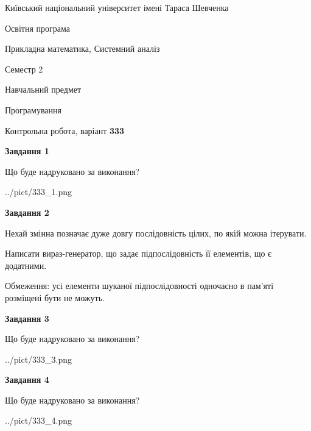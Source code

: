 \documentclass[12pt, ukrainian]{article}
\begin{document}
{{\begin {small}\par
{ \center  Київський національний університет імені Тараса Шевченка \par}
{\parbox {5 cm}{Освітня програма \hfill}{\parbox {8 cm}{Прикладна математика, Системний аналіз \hfill}}\parbox {5 cm}{\hfill Семестр 2}}\par
{\parbox {5 cm} {Навчальний предмет \hfill}\parbox {7 cm}{Програмування \hfill}\parbox {6cm}{\hfill}\par}\vspace{-7pt} \end{small}}{\center Контрольна робота, варіант  \No \textbf
{ 333 }\par}}
{
\begin {large}
{\begin {center}\textbf{Завдання 1}\end {center}}\par
Що буде надруковано за виконання?\par\par
\begin{center}
	{../pict/333_1.png}
\end{center}
\newpage

{\begin {center}\textbf{Завдання 2}\end {center}}\par
Нехай змінна  позначає дуже довгу послідовність цілих, по якій можна ітерувати.

Написати вираз-генератор, що задає підпослідовність її елементів, що є додатни\-ми.

Обмеження: усі елементи шуканої підпослідовності одночасно в пам'яті розміщені бути не можуть.\par
\newpage

{\begin {center}\textbf{Завдання 3}\end {center}}\par
Що буде надруковано за виконання?\par
\begin{center}
	{../pict/333_3.png}
\end{center}
\newpage

{\begin {center}\textbf{Завдання 4}\end {center}}\par
Що буде надруковано за виконання?\par
\begin{center}
	{../pict/333_4.png}
\end{center}
\newpage


\end{large}}
\end{document}
